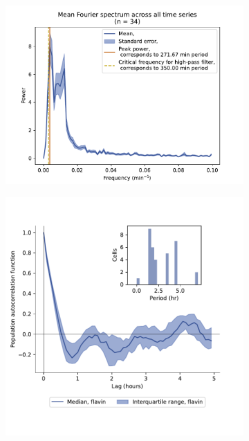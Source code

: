 \begin{figure}[hb!]
  \centering
  \begin{subfigure}[htpb]{0.45\textwidth}
   \centering
   \includegraphics[width=\textwidth]{cenpkkoetter_20212_13.pdf}
   \caption{
   }
   \label{fig:biology-cenpk-sync-fourier}
  \end{subfigure}%
  \begin{subfigure}[htpb]{0.45\textwidth}
   \centering
   \includegraphics[width=\textwidth]{cenpkkoetter_20212_12.pdf}
   \caption{
   }
   \label{fig:biology-cenpk-sync-acf}
  \end{subfigure}


\end{figure}
